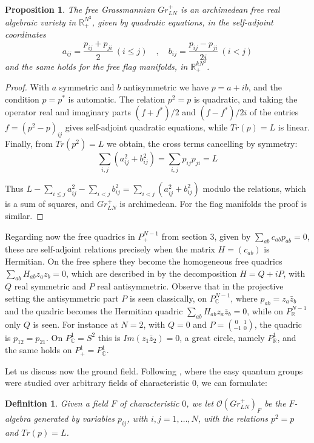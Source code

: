 \documentclass[11pt]{article}
\theoremstyle{plain}
\newtheorem{proposition}[theorem]{Proposition}
\newtheorem{definition}[theorem]{Definition}
\begin{document}
\begin{proposition}
\label{prop:archimedean}
The free Grassmannian $Gr^+_{LN}$ is an archimedean free real algebraic variety in $\mathbb R^{N^2}_+$, given by quadratic equations, in the self-adjoint coordinates
$$a_{ij}=\frac{p_{ij}+p_{ji}}{2}\ (i\leq j)\quad,\quad b_{ij}=\frac{p_{ij}-p_{ji}}{2i}\ (i<j)$$
and the same holds for the free flag manifolds, in $\mathbb R^{kN^2}_+$.
\end{proposition}

\begin{proof}
With $a$ symmetric and $b$ antisymmetric we have $p=a+ib$, and the condition $p=p^*$ is automatic. The relation $p^2=p$ is quadratic, and taking the operator real and imaginary parts $(f+f^*)/2$ and $(f-f^*)/2i$ of the entries $f=(p^2-p)_{ij}$ gives self-adjoint quadratic equations, while $Tr(p)=L$ is linear. Finally, from $Tr(p^2)=L$ we obtain, the cross terms cancelling by symmetry:
$$\sum_{i,j}(a_{ij}^2+b_{ij}^2)=\sum_{i,j}p_{ij}p_{ji}=L$$

Thus $L-\sum_{i\leq j}a_{ij}^2-\sum_{i<j}b_{ij}^2=\sum_{i<j}(a_{ij}^2+b_{ij}^2)$ modulo the relations, which is a sum of squares, and $Gr^+_{LN}$ is archimedean. For the flag manifolds the proof is similar.
\end{proof}

Regarding now the free quadrics in $P^{N-1}_+$ from section 3, given by $\sum_{ab}c_{ab}p_{ab}=0$, these are self-adjoint relations precisely when the matrix $H=(c_{ab})$ is Hermitian. On the free sphere they become the homogeneous free quadrics $\sum_{ab}H_{ab}z_az_b=0$, which are described in \cite{fba} by the decomposition $H=Q+iP$, with $Q$ real symmetric and $P$ real antisymmetric. Observe that in the projective setting the antisymmetric part $P$ is seen classically, on $P^{N-1}_\mathbb C$, where $p_{ab}=z_a\bar{z}_b$ and the quadric becomes the Hermitian quadric $\sum_{ab}H_{ab}z_a\bar{z}_b=0$, while on $P^{N-1}_\mathbb R$ only $Q$ is seen. For instance at $N=2$, with $Q=0$ and $P=(^{\ 0\ }_{-1}{\ }^1_0)$, the quadric is $p_{12}=p_{21}$. On $P^1_\mathbb C=S^2$ this is $Im(z_1\bar{z}_2)=0$, a great circle, namely $P^1_\mathbb R$, and the same holds on $P^1_+=P^1_\mathbb C$.

\bigskip

Let us discuss now the ground field. Following \cite{oba}, where the easy quantum groups were studied over arbitrary fields of characteristic 0, we can formulate:

\begin{definition}
Given a field $F$ of characteristic $0$, we let $\mathcal O(Gr^+_{LN})_F$ be the $F$-algebra generated by variables $p_{ij}$, with $i,j=1,\ldots,N$, with the relations $p^2=p$ and $Tr(p)=L$.
\end{definition}
\end{document}
